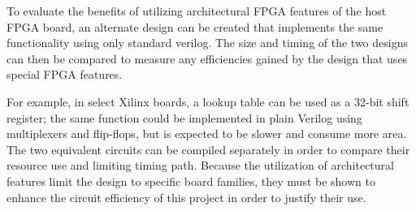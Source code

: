 To evaluate the benefits of utilizing architectural FPGA features of the host FPGA board, an alternate design can be created that implements the same functionality using only standard verilog.
The size and timing of the two designs can then be compared to measure any efficiencies gained by the design that uses special FPGA features.

For example, in select Xilinx boards, a lookup table can be used as a 32-bit shift register; the same function could be implemented in plain Verilog using multiplexers and flip-flops, but is expected to be slower and consume more area.
The two equivalent circuits can be compiled separately in order to compare their resource use and limiting timing path.
Because the utilization of architectural features limit the design to specific board families, they must be shown to enhance the circuit efficiency of this project in order to justify their use.
